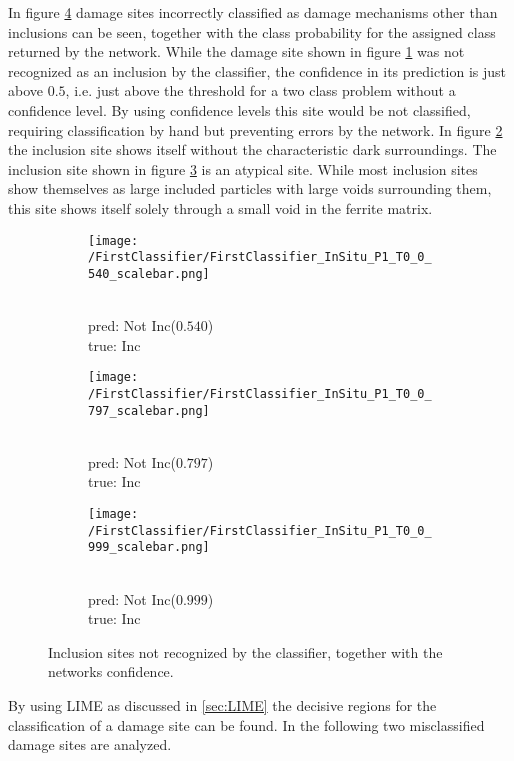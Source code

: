 In figure \ref{fig:FirstClassifierInSituP1T0} damage sites incorrectly classified as damage mechanisms other than inclusions can be seen, together with the class probability for the assigned class returned by the network. While the damage site shown in figure \ref{sub:InSituP1T10_1} was not recognized as an inclusion by the classifier, the confidence in its prediction is just above $0.5$, i.e. just above the threshold for a two class problem without a confidence level. By using confidence levels this site would be not classified, requiring classification by hand but preventing errors by the network. In figure \ref{sub:InSituP1T0_2} the inclusion site shows itself without the characteristic dark surroundings. The inclusion site shown in figure \ref{sub:InSituP1T0_3} is an atypical site. While most inclusion sites show themselves as large included particles with large voids surrounding them, this site shows itself solely through a small void in the ferrite matrix. \\
\begin{figure}[H]
\centering
\begin{subfigure}{.3\textwidth}
\texttt{[image: /FirstClassifier/FirstClassifier\_InSitu\_P1\_T0\_0\_540\_scalebar.png]}
\caption{\\pred: Not Inc($0.540$) \\true: Inc}
\label{sub:InSituP1T10_1}
\end{subfigure}
\centering
\begin{subfigure}{.3\textwidth}
\texttt{[image: /FirstClassifier/FirstClassifier\_InSitu\_P1\_T0\_0\_797\_scalebar.png]}
\caption{\\pred: Not Inc($0.797$) \\true: Inc}
\label{sub:InSituP1T0_2}
\end{subfigure}
\centering
\begin{subfigure}{.3\textwidth}
\texttt{[image: /FirstClassifier/FirstClassifier\_InSitu\_P1\_T0\_0\_999\_scalebar.png]}
\caption{\\pred: Not Inc($0.999$) \\true: Inc}
\label{sub:InSituP1T0_3}
\end{subfigure}
\caption{Inclusion sites not recognized by the classifier, together with the networks confidence.}
\label{fig:FirstClassifierInSituP1T0}
\end{figure}

By using LIME as discussed in \ref{sec:LIME} the decisive regions for the classification of a damage site can be found. In the following two misclassified damage sites are analyzed.\\

